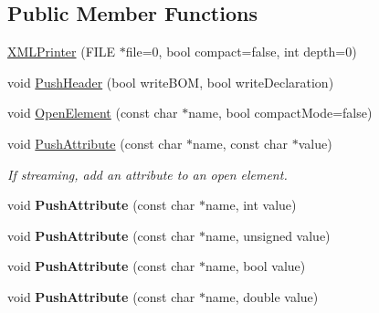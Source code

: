 \subsection*{Public Member Functions}
\begin{DoxyCompactItemize}
\item 
\hyperlink{classtinyxml2_1_1_x_m_l_printer_aa6d3841c069085f5b8a27bc7103c04f7}{X\+M\+L\+Printer} (F\+I\+L\+E $\ast$file=0, bool compact=false, int depth=0)
\item 
void \hyperlink{classtinyxml2_1_1_x_m_l_printer_a178c608ce8476043d5d6513819cde903}{Push\+Header} (bool write\+B\+O\+M, bool write\+Declaration)
\item 
void \hyperlink{classtinyxml2_1_1_x_m_l_printer_a20fb06c83bd13e5140d7dd13af06c010}{Open\+Element} (const char $\ast$name, bool compact\+Mode=false)
\item 
\hypertarget{classtinyxml2_1_1_x_m_l_printer_a9a4e2c9348b42e147629d5a99f4af3f0}{}void \hyperlink{classtinyxml2_1_1_x_m_l_printer_a9a4e2c9348b42e147629d5a99f4af3f0}{Push\+Attribute} (const char $\ast$name, const char $\ast$value)\label{classtinyxml2_1_1_x_m_l_printer_a9a4e2c9348b42e147629d5a99f4af3f0}

\begin{DoxyCompactList}\small\item\em If streaming, add an attribute to an open element. \end{DoxyCompactList}\item 
\hypertarget{classtinyxml2_1_1_x_m_l_printer_a69120c82088597372d28d0a98f2ee7a1}{}void {\bfseries Push\+Attribute} (const char $\ast$name, int value)\label{classtinyxml2_1_1_x_m_l_printer_a69120c82088597372d28d0a98f2ee7a1}

\item 
\hypertarget{classtinyxml2_1_1_x_m_l_printer_aa41039e51990aaf5342f3e0575a692c4}{}void {\bfseries Push\+Attribute} (const char $\ast$name, unsigned value)\label{classtinyxml2_1_1_x_m_l_printer_aa41039e51990aaf5342f3e0575a692c4}

\item 
\hypertarget{classtinyxml2_1_1_x_m_l_printer_a51f7950d7b7a19f0d3a0d549a318d45f}{}void {\bfseries Push\+Attribute} (const char $\ast$name, bool value)\label{classtinyxml2_1_1_x_m_l_printer_a51f7950d7b7a19f0d3a0d549a318d45f}

\item 
\hypertarget{classtinyxml2_1_1_x_m_l_printer_a1714867af40e68ca404c3e84b6cac2a6}{}void {\bfseries Push\+Attribute} (const char $\ast$name, double value)\label{classtinyxml2_1_1_x_m_l_printer_a1714867af40e68ca404c3e84b6cac2a6}


\end{DoxyCompactItemize}
